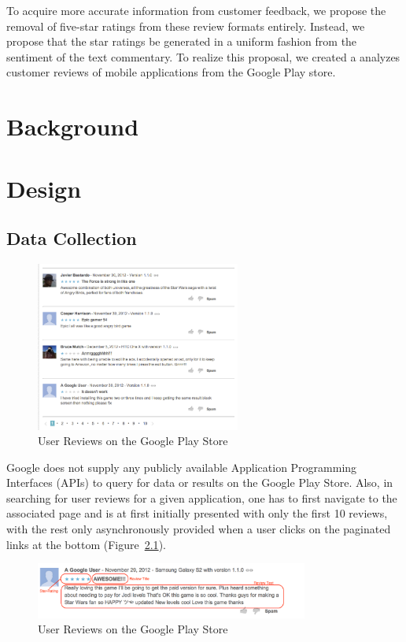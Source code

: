 \documentclass[11pt]{report} %
\begin{document}
To acquire more accurate information from customer feedback, we propose the removal of five-star ratings from these review formats entirely. Instead, we propose that the star ratings be generated in a uniform fashion from the sentiment of the text commentary. To  realize this proposal, we created a analyzes customer reviews of mobile applications from the Google Play store.

\chapter{Background}

\chapter{Design}
\section{Data Collection}

\begin{figure}[h!]
  \centering
    \includegraphics[width=0.6\textwidth]{figures/playstore.png}
 \caption{User Reviews on the Google Play Store}
\label{fig:playstore}
\end{figure}

Google does not supply any publicly available Application Programming Interfaces (APIs) to query for data or results on the Google Play Store. Also, in searching for user reviews for a given application, one has to first navigate to the associated page and is at first initially presented with only the first 10 reviews, with the rest only asynchronously provided when a user clicks on the paginated links at the bottom (Figure~\ref{fig:playstore}). 

\begin{figure}[h!]
  \centering
    \includegraphics[width=0.8\textwidth]{figures/user_review.png}
 \caption{User Reviews on the Google Play Store}
\label{fig:user_review}
\end{figure}
\end{document}
